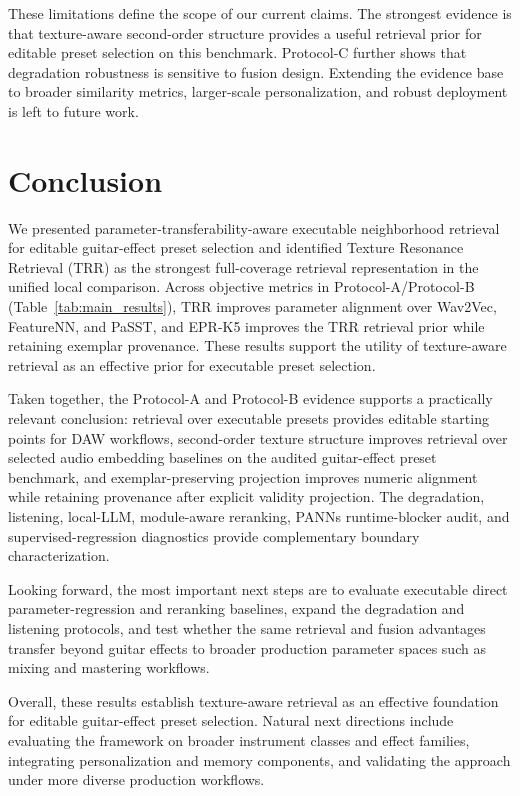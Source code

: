 These limitations define the scope of our current claims. The strongest evidence is that texture-aware second-order structure provides a useful retrieval prior for editable preset selection on this benchmark. Protocol-C further shows that degradation robustness is sensitive to fusion design. Extending the evidence base to broader similarity metrics, larger-scale personalization, and robust deployment is left to future work.

\section{Conclusion}
\label{sec:conclusion}

We presented parameter-transferability-aware executable neighborhood retrieval for editable guitar-effect preset selection and identified Texture Resonance Retrieval (TRR) as the strongest full-coverage retrieval representation in the unified local comparison. Across objective metrics in Protocol-A/Protocol-B (Table~\ref{tab:main_results}), TRR improves parameter alignment over Wav2Vec, FeatureNN, and PaSST, and EPR-K5 improves the TRR retrieval prior while retaining exemplar provenance. These results support the utility of texture-aware retrieval as an effective prior for executable preset selection.

Taken together, the Protocol-A and Protocol-B evidence supports a practically relevant conclusion: retrieval over executable presets provides editable starting points for DAW workflows, second-order texture structure improves retrieval over selected audio embedding baselines on the audited guitar-effect preset benchmark, and exemplar-preserving projection improves numeric alignment while retaining provenance after explicit validity projection. The degradation, listening, local-LLM, module-aware reranking, PANNs runtime-blocker audit, and supervised-regression diagnostics provide complementary boundary characterization.

Looking forward, the most important next steps are to evaluate executable direct parameter-regression and reranking baselines, expand the degradation and listening protocols, and test whether the same retrieval and fusion advantages transfer beyond guitar effects to broader production parameter spaces such as mixing and mastering workflows.

Overall, these results establish texture-aware retrieval as an effective foundation for editable guitar-effect preset selection. Natural next directions include evaluating the framework on broader instrument classes and effect families, integrating personalization and memory components, and validating the approach under more diverse production workflows.


\begingroup
\sloppy
\raggedright
{}

\endgroup
